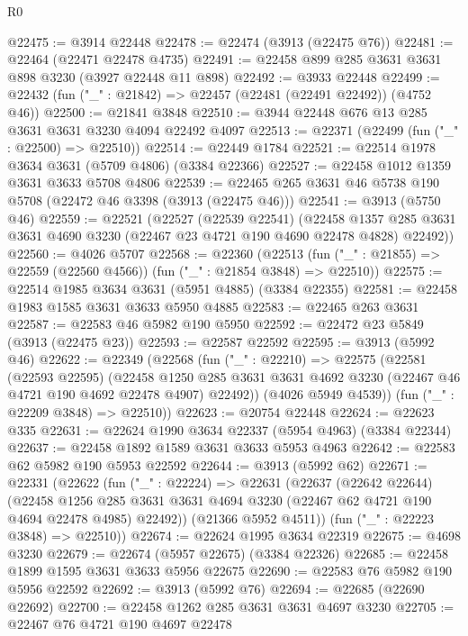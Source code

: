\begin{lexlean}{R0}
\begin{coremodule}
@22475 := @3914 @22448
@22478 := @22474 (@3913 (@22475 @76))
@22481 := @22464 (@22471 @22478 @4735)
@22491 := @22458 @899 @285 @3631 @3631 @898 @3230 (@3927 @22448 @11 @898)
@22492 := @3933 @22448
@22499 := @22432 (fun ("_" : @21842) => @22457 (@22481 (@22491 @22492)) (@4752 @46))
@22500 := @21841 @3848
@22510 := @3944 @22448 @676 @13 @285 @3631 @3631 @3230 @4094 @22492 @4097
@22513 := @22371 (@22499 (fun ("_" : @22500) => @22510))
@22514 := @22449 @1784
@22521 := @22514 @1978 @3634 @3631 (@5709 @4806) (@3384 @22366)
@22527 := @22458 @1012 @1359 @3631 @3633 @5708 @4806
@22539 := @22465 @265 @3631 @46 @5738 @190 @5708 (@22472 @46 @3398 (@3913 (@22475 @46)))
@22541 := @3913 (@5750 @46)
@22559 := @22521
    (@22527
      (@22539 @22541)
      (@22458 @1357 @285 @3631 @3631 @4690 @3230 (@22467 @23 @4721 @190 @4690 @22478 @4828) @22492))
@22560 := @4026 @5707
@22568 := @22360
    (@22513 (fun ("_" : @21855) => @22559 (@22560 @4566)) (fun ("_" : @21854 @3848) => @22510))
@22575 := @22514 @1985 @3634 @3631 (@5951 @4885) (@3384 @22355)
@22581 := @22458 @1983 @1585 @3631 @3633 @5950 @4885
@22583 := @22465 @263 @3631
@22587 := @22583 @46 @5982 @190 @5950
@22592 := @22472 @23 @5849 (@3913 (@22475 @23))
@22593 := @22587 @22592
@22595 := @3913 (@5992 @46)
@22622 := @22349
    (@22568
      (fun ("_" : @22210) =>
      @22575
        (@22581
          (@22593 @22595)
          (@22458
            @1250
            @285
            @3631
            @3631
            @4692
            @3230
            (@22467 @46 @4721 @190 @4692 @22478 @4907)
            @22492))
        (@4026 @5949 @4539))
      (fun ("_" : @22209 @3848) => @22510))
@22623 := @20754 @22448
@22624 := @22623 @335
@22631 := @22624 @1990 @3634 @22337 (@5954 @4963) (@3384 @22344)
@22637 := @22458 @1892 @1589 @3631 @3633 @5953 @4963
@22642 := @22583 @62 @5982 @190 @5953 @22592
@22644 := @3913 (@5992 @62)
@22671 := @22331
    (@22622
      (fun ("_" : @22224) =>
      @22631
        (@22637
          (@22642 @22644)
          (@22458
            @1256
            @285
            @3631
            @3631
            @4694
            @3230
            (@22467 @62 @4721 @190 @4694 @22478 @4985)
            @22492))
        (@21366 @5952 @4511))
      (fun ("_" : @22223 @3848) => @22510))
@22674 := @22624 @1995 @3634 @22319
@22675 := @4698 @3230
@22679 := @22674 (@5957 @22675) (@3384 @22326)
@22685 := @22458 @1899 @1595 @3631 @3633 @5956 @22675
@22690 := @22583 @76 @5982 @190 @5956 @22592
@22692 := @3913 (@5992 @76)
@22694 := @22685 (@22690 @22692)
@22700 := @22458 @1262 @285 @3631 @3631 @4697 @3230
@22705 := @22467 @76 @4721 @190 @4697 @22478

\end{coremodule}
\end{lexlean}
